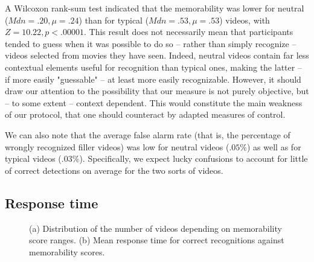 \documentclass[sigconf]{acmart}
\begin{document}
A Wilcoxon rank-sum test indicated that the memorability was lower for neutral ($Mdn=.20, \mu=.24$) than for typical ($Mdn=.53, \mu=.53$) videos, with $Z=10.22, p<.00001$.
This result does not necessarily mean that participants tended to guess when it was possible to do so -- rather than simply recognize -- videos selected from movies they have seen.
Indeed, neutral videos contain far less contextual elements useful for recognition than typical ones, making the latter -- if more easily "guessable" -- at least more easily recognizable.
However, it should draw our attention to the possibility that our measure is not purely objective, but -- to some extent -- context dependent.
This would constitute the main weakness of our protocol, that one should counteract by adapted measures of control.

We can also note that the average false alarm rate (that is, the percentage of wrongly recognized filler videos) was low for neutral videos ($.05\%$) as well as for typical videos ($.03\%$).
Specifically, we expect lucky confusions to account for little of correct detections on average for the two sorts of videos.

\subsection{Response time}
\begin{figure}[!htbp]
	\centering
	\quad
	\quad
	\caption{\label{fig:response_time_vs_memorability}(a) Distribution of the number of videos depending on memorability score ranges. (b) Mean response time for correct recognitions against memorability scores.}
\end{figure}
\end{document}
